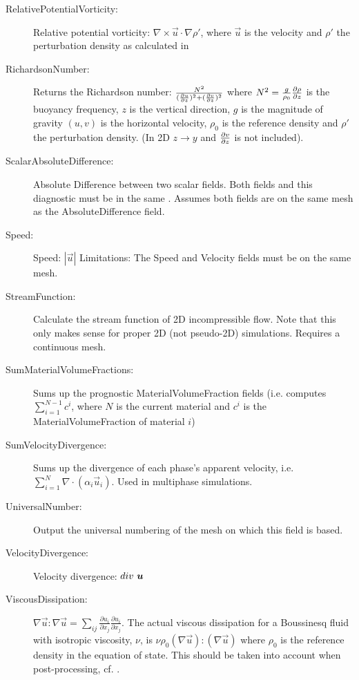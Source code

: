 \begin{description}
\item[RelativePotentialVorticity:]Relative potential vorticity:  $\nabla \times \vec{u} \cdot \nabla \rho'$, where $\vec{u}$ is the velocity and $\rho '$ the perturbation density as calculated in    
\item[RichardsonNumber:]Returns the Richardson number: $\frac{N^2}{(\ppt[z]{u})^2+(\ppx[z]{v})^2}$ where $N^2 = \frac{g}{\rho_0}\ppt[z]{\rho}$ is the buoyancy frequency, $z$ is the vertical direction, $g$ is the magnitude of gravity $(u,v)$ is the horizontal velocity, $\rho_0$ is the reference density and $\rho '$ the perturbation density. (In 2D $z\rightarrow y$ and $\ppx[z]{v}$ is not included). 
\item[ScalarAbsoluteDifference:]Absolute Difference between two scalar fields. Both fields and this diagnostic  must be in the same . Assumes both fields are on the same mesh as the AbsoluteDifference field.  
\item[Speed:]Speed: $|\vec{u}|$ 
	Limitations: The Speed and Velocity fields must be on the same mesh. 
\item[StreamFunction:]Calculate the stream function of 2D incompressible flow. Note that this only makes sense for proper 2D (not pseudo-2D) simulations. Requires a continuous mesh.
\item[SumMaterialVolumeFractions:]Sums up the prognostic MaterialVolumeFraction fields (i.e. computes $\sum_{i=1}^{N-1}c^i$, where $N$ is the current material and $c^i$ is the MaterialVolumeFraction of material $i$)
\item[SumVelocityDivergence:]Sums up the divergence of each phase's apparent velocity, i.e. $\sum_{i=1}^N{\nabla\cdot(\alpha_i\vec{u}_i)}$. Used in multiphase simulations. 
\item[UniversalNumber:]Output the universal numbering of the mesh on which this field is based.
\item[VelocityDivergence:]Velocity divergence: $div \mbox{ \vec{u}}$ 
\item[ViscousDissipation:] $\nabla \vec{u} : \nabla \vec{u} = \sum _{ij}\frac{\partial u_i}{\partial x_j}\frac{\partial u_i}{\partial x_j}$. The actual viscous dissipation for a Boussinesq fluid with isotropic viscosity, $\nu$, is $\nu \rho_0 (\nabla \vec{u}):(\nabla \vec{u})$ where $\rho_0$ is the reference density in the equation of state. This should be taken into account when post-processing, cf. \cite{winters1995}. \\

\end{description}
